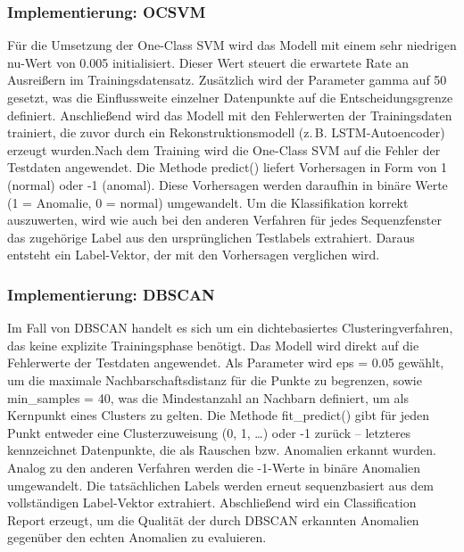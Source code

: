 \documentclass[a4paper,12pt]{article}
\begin{document}
	\subsubsection{Implementierung: OCSVM}
	Für die Umsetzung der One-Class SVM wird das Modell mit einem sehr niedrigen \gls{nu}-Wert von 0.005 initialisiert. Dieser Wert steuert die erwartete Rate an Ausreißern im Trainingsdatensatz. Zusätzlich wird der Parameter \gls{gamma} auf 50 gesetzt, was die Einflussweite einzelner Datenpunkte auf die Entscheidungsgrenze definiert. Anschließend wird das Modell mit den Fehlerwerten der Trainingsdaten trainiert, die zuvor durch ein Rekonstruktionsmodell (z.\,B. LSTM-Autoencoder) erzeugt wurden.Nach dem Training wird die One-Class SVM auf die Fehler der Testdaten angewendet. Die Methode predict() liefert Vorhersagen in Form von 1 (normal) oder -1 (anomal). Diese Vorhersagen werden daraufhin in binäre Werte (1 = Anomalie, 0 = normal) umgewandelt. Um die Klassifikation korrekt auszuwerten, wird wie auch bei den anderen Verfahren für jedes Sequenzfenster das zugehörige Label aus den ursprünglichen Testlabels extrahiert. Daraus entsteht ein Label-Vektor, der mit den Vorhersagen verglichen wird.
	
	\subsubsection{Implementierung: DBSCAN}
	Im Fall von DBSCAN handelt es sich um ein dichtebasiertes Clusteringverfahren, das keine explizite Trainingsphase benötigt. Das Modell wird direkt auf die Fehlerwerte der Testdaten angewendet. Als Parameter wird eps = 0.05 gewählt, um die maximale Nachbarschaftsdistanz für die Punkte zu begrenzen, sowie min\_samples = 40, was die Mindestanzahl an Nachbarn definiert, um als Kernpunkt eines Clusters zu gelten. Die Methode fit\_predict() gibt für jeden Punkt entweder eine Clusterzuweisung (0, 1, …) oder -1 zurück – letzteres kennzeichnet Datenpunkte, die als Rauschen bzw. Anomalien erkannt wurden.
	Analog zu den anderen Verfahren werden die -1-Werte in binäre Anomalien umgewandelt. Die tatsächlichen Labels werden erneut sequenzbasiert aus dem vollständigen Label-Vektor extrahiert. Abschließend wird ein Classification Report erzeugt, um die Qualität der durch DBSCAN erkannten Anomalien gegenüber den echten Anomalien zu evaluieren.
	
\end{document}

